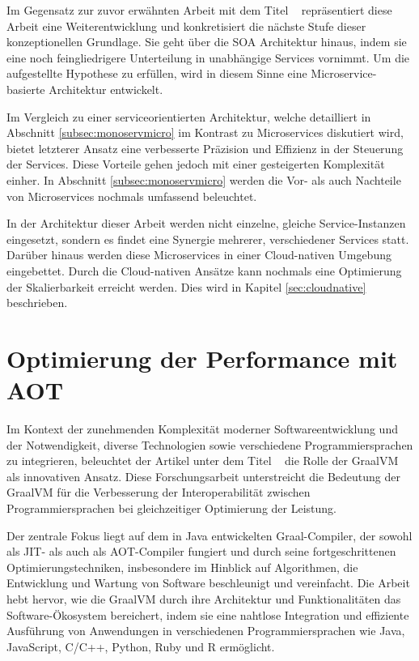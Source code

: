 Im Gegensatz zur zuvor erwähnten Arbeit mit dem Titel \textit{~\parencite[vgl.][]{ElAraby2018}{}{}} repräsentiert diese Arbeit eine Weiterentwicklung und konkretisiert die nächste Stufe dieser konzeptionellen Grundlage. Sie geht über die \ac{SOA} Architektur hinaus, indem sie eine noch feingliedrigere Unterteilung in unabhängige Services vornimmt. Um die aufgestellte Hypothese zu erfüllen, wird in diesem Sinne eine Microservice-basierte Architektur entwickelt.

Im Vergleich zu einer serviceorientierten Architektur, welche detailliert in Abschnitt \ref{subsec:monoservmicro} im Kontrast zu Microservices diskutiert wird, bietet letzterer Ansatz eine verbesserte Präzision und Effizienz in der Steuerung der Services. Diese Vorteile gehen jedoch mit einer gesteigerten Komplexität einher. In Abschnitt \ref{subsec:monoservmicro} werden die Vor- als auch Nachteile von Microservices nochmals umfassend beleuchtet.

In der Architektur dieser Arbeit werden nicht einzelne, gleiche Service-Instanzen eingesetzt, sondern es findet eine Synergie mehrerer, verschiedener Services statt. Darüber hinaus werden diese Microservices in einer Cloud-nativen Umgebung eingebettet. Durch die Cloud-nativen Ansätze kann nochmals eine Optimierung der Skalierbarkeit erreicht werden. Dies wird in Kapitel \ref{sec:cloudnative} beschrieben.
\section{Optimierung der Performance mit \acl{AOT}}
Im Kontext der zunehmenden Komplexität moderner Softwareentwicklung und der Notwendigkeit, diverse Technologien sowie verschiedene Programmiersprachen zu integrieren, beleuchtet der Artikel unter dem Titel ~\parencite[vgl.][]{8756917} die Rolle der GraalVM als innovativen Ansatz. Diese Forschungsarbeit unterstreicht die Bedeutung der GraalVM für die Verbesserung der Interoperabilität zwischen Programmiersprachen bei gleichzeitiger Optimierung der Leistung. 

Der zentrale Fokus liegt auf dem in Java entwickelten Graal-Compiler, der sowohl als \ac{JIT}- als auch als \ac{AOT}-Compiler fungiert und durch seine fortgeschrittenen Optimierungstechniken, insbesondere im Hinblick auf Algorithmen, die Entwicklung und Wartung von Software beschleunigt und vereinfacht. 
\newpage
Die Arbeit hebt hervor, wie die GraalVM durch ihre Architektur und Funktionalitäten das Software-Ökosystem bereichert, indem sie eine nahtlose Integration und effiziente Ausführung von Anwendungen in verschiedenen Programmiersprachen wie Java, JavaScript, C/C++, Python, Ruby und R ermöglicht.

